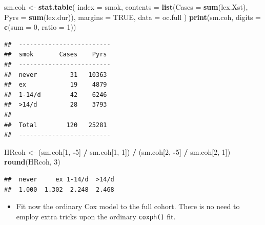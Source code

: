 \documentclass[
]{book}
\newenvironment{Shaded}{\begin{snugshade}}{\end{snugshade}}
\newcommand{\AttributeTok}[1]{\textcolor[rgb]{0.13,0.29,0.53}{#1}}
\newcommand{\ConstantTok}[1]{\textcolor[rgb]{0.56,0.35,0.01}{#1}}
\newcommand{\DecValTok}[1]{\textcolor[rgb]{0.00,0.00,0.81}{#1}}
\newcommand{\FunctionTok}[1]{\textcolor[rgb]{0.13,0.29,0.53}{\textbf{#1}}}
\newcommand{\NormalTok}[1]{#1}
\newcommand{\OtherTok}[1]{\textcolor[rgb]{0.56,0.35,0.01}{#1}}
\newcommand{\SpecialCharTok}[1]{\textcolor[rgb]{0.81,0.36,0.00}{\textbf{#1}}}
\providecommand{\tightlist}{%
  \setlength{\itemsep}{0pt}\setlength{\parskip}{0pt}}
\begin{document}
\begin{Shaded}
\begin{Highlighting}[]
\NormalTok{sm.coh }\OtherTok{\textless{}{-}} \FunctionTok{stat.table}\NormalTok{(}
  \AttributeTok{index =}\NormalTok{ smok,}
  \AttributeTok{contents =} \FunctionTok{list}\NormalTok{(}\AttributeTok{Cases =} \FunctionTok{sum}\NormalTok{(lex.Xst), }\AttributeTok{Pyrs =} \FunctionTok{sum}\NormalTok{(lex.dur)),}
  \AttributeTok{margins =} \ConstantTok{TRUE}\NormalTok{, }
  \AttributeTok{data =}\NormalTok{ oc.full}
\NormalTok{)}
\FunctionTok{print}\NormalTok{(sm.coh, }\AttributeTok{digits =} \FunctionTok{c}\NormalTok{(}\AttributeTok{sum =} \DecValTok{0}\NormalTok{, }\AttributeTok{ratio =} \DecValTok{1}\NormalTok{))}
\end{Highlighting}
\end{Shaded}

\begin{verbatim}
##  ------------------------- 
##  smok       Cases    Pyrs  
##  ------------------------- 
##  never         31   10363  
##  ex            19    4879  
##  1-14/d        42    6246  
##  >14/d         28    3793  
##                            
##  Total        120   25281  
##  -------------------------
\end{verbatim}

\begin{Shaded}
\begin{Highlighting}[]
\NormalTok{HRcoh }\OtherTok{\textless{}{-}} 
\NormalTok{  (sm.coh[}\DecValTok{1}\NormalTok{, }\SpecialCharTok{{-}}\DecValTok{5}\NormalTok{] }\SpecialCharTok{/}\NormalTok{ sm.coh[}\DecValTok{1}\NormalTok{, }\DecValTok{1}\NormalTok{]) }\SpecialCharTok{/}\NormalTok{ (sm.coh[}\DecValTok{2}\NormalTok{, }\SpecialCharTok{{-}}\DecValTok{5}\NormalTok{] }\SpecialCharTok{/}\NormalTok{ sm.coh[}\DecValTok{2}\NormalTok{, }\DecValTok{1}\NormalTok{])}
\FunctionTok{round}\NormalTok{(HRcoh, }\DecValTok{3}\NormalTok{)}
\end{Highlighting}
\end{Shaded}

\begin{verbatim}
##  never     ex 1-14/d  >14/d 
##  1.000  1.302  2.248  2.468
\end{verbatim}

\begin{itemize}
\tightlist
\item
  Fit now the ordinary Cox model to the full cohort. There is no need
  to employ extra tricks upon the ordinary \texttt{coxph()} fit.
\end{itemize}
\end{document}
